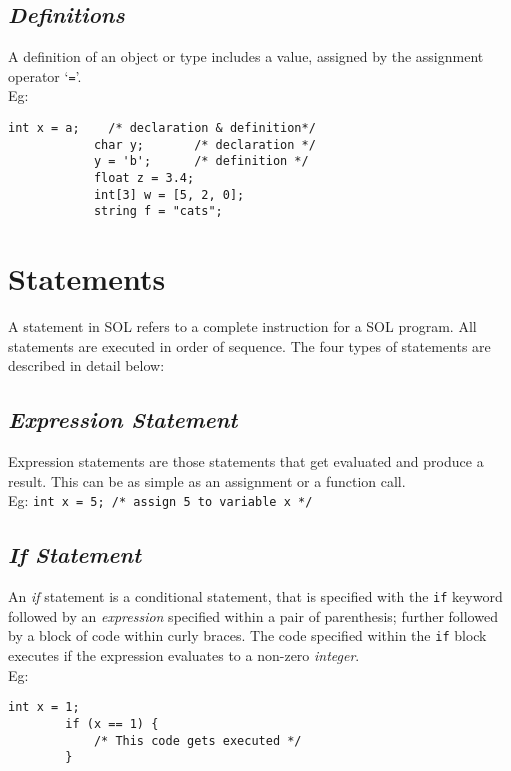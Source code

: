 \documentclass[letterpaper,12pt]{article}
\begin{document}
    \subsection{\textit{Definitions}}
    A definition of an object or type includes a value, assigned by the assignment operator `\texttt{=}'.\\
    Eg: \begin{lstlisting}[aboveskip=-13pt]
            int x = a;    /* declaration & definition*/
            char y;       /* declaration */
            y = 'b';      /* definition */
            float z = 3.4;
            int[3] w = [5, 2, 0];
            string f = "cats";
        \end{lstlisting}

\section{Statements} \label{classes}
A statement in SOL refers to a complete instruction for a SOL program. All statements are executed in order of sequence. The four types of statements are described in detail below:\\

\subsection{\textit{Expression Statement}}
Expression statements are those statements that get evaluated and produce a result. This can be as simple as an assignment or a function call.\\
Eg: \texttt{int x = 5; /* assign 5 to variable x */}

\subsection{\textit{If Statement}}
An \textit{if} statement is a conditional statement, that is specified with the \texttt{if} keyword followed by an \textit{expression} specified within a pair of parenthesis; further followed by a block of code within curly braces. The code specified within the \texttt{if} block executes if the expression evaluates to a non-zero \textit{integer}.\\
Eg: \begin{lstlisting}[aboveskip=-13pt]
        int x = 1;
        if (x == 1) {
            /* This code gets executed */
        }
    \end{lstlisting}
\end{document}
